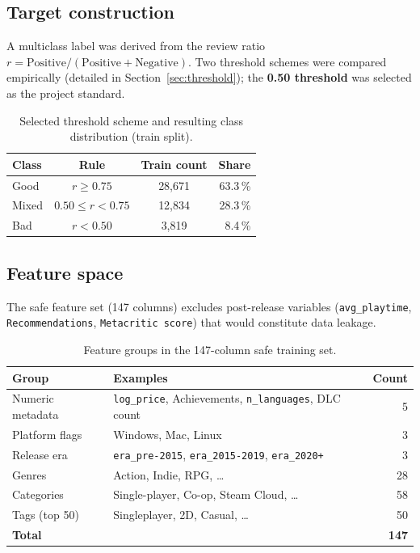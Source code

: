\documentclass[11pt, a4paper]{article}
\newcommand{\ttf}[1]{\texttt{#1}}
\begin{document}
\subsection{Target construction}
A multiclass label was derived from the review ratio
$r = \text{Positive} / (\text{Positive} + \text{Negative})$.
Two threshold schemes were compared empirically
(detailed in Section~\ref{sec:threshold}); the \textbf{0.50 threshold} was
selected as the project standard.

\begin{table}[H]
  \centering\small
  \caption{Selected threshold scheme and resulting class distribution (train split).}
  \label{tab:classdist}
  \begin{tabular}{lccr}
    \toprule
    \textbf{Class} & \textbf{Rule} & \textbf{Train count} & \textbf{Share} \\
    \midrule
    Good  & $r \geq 0.75$          & 28,671 & 63.3\,\% \\
    Mixed & $0.50 \leq r < 0.75$   & 12,834 & 28.3\,\% \\
    Bad   & $r < 0.50$             &  3,819 &  8.4\,\% \\
    \bottomrule
  \end{tabular}
\end{table}

\subsection{Feature space}
The safe feature set (147 columns) excludes post-release variables
(\ttf{avg\_playtime}, \ttf{Recommendations}, \ttf{Metacritic score})
that would constitute data leakage.

\begin{table}[H]
  \centering\small
  \caption{Feature groups in the 147-column safe training set.}
  \label{tab:features}
  \begin{tabular}{llr}
    \toprule
    \textbf{Group}   & \textbf{Examples} & \textbf{Count} \\
    \midrule
    Numeric metadata & \ttf{log\_price}, Achievements, \ttf{n\_languages}, DLC count & 5 \\
    Platform flags   & Windows, Mac, Linux & 3 \\
    Release era      & \ttf{era\_pre-2015}, \ttf{era\_2015-2019}, \ttf{era\_2020+} & 3 \\
    Genres           & Action, Indie, RPG, \ldots & 28 \\
    Categories       & Single-player, Co-op, Steam Cloud, \ldots & 58 \\
    Tags (top 50)    & Singleplayer, 2D, Casual, \ldots & 50 \\
    \midrule
    \textbf{Total}   & & \textbf{147} \\
    \bottomrule
  \end{tabular}
\end{table}
\end{document}
